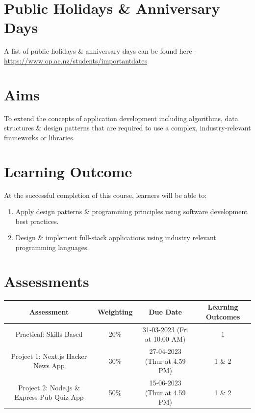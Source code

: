 \documentclass{article}
\begin{document}
\section*{Public Holidays \& Anniversary Days}
A list of public holidays \& anniversary days can be found here - \href{https://www.op.ac.nz/students/importantdates}{https://www.op.ac.nz/students/importantdates}

\section*{Aims}
To extend the concepts of application development including algorithms, data structures \& design patterns that are required to use a complex, industry-relevant frameworks or libraries.

\section*{Learning Outcome}
At the successful completion of this course, learners will be able to:
\begin{enumerate}
	\item Apply design patterns \& programming principles using software development best practices.
	\item Design \& implement full-stack applications using industry relevant programming languages.
\end{enumerate}

\section*{Assessments}
\renewcommand{\arraystretch}{1.5}
\begin{tabular}{|c|c|c|c|}
	\hline
	\textbf{Assessment}                                 & \textbf{Weighting} & \textbf{Due Date}            & \textbf{Learning Outcomes} \\ \hline
	\small Practical: Skills-Based & \small 20\%        & \small 31-03-2023 (Fri at 10.00 AM)   & \small 1                   \\ \hline
	\small Project 1: Next.js Hacker News App             & \small 30\%        & \small 27-04-2023 (Thur at 4.59 PM)  & \small 1 \& 2                   \\ \hline
	\small Project 2: Node.js \& Express Pub Quiz App                       & \small 50\%        & \small 15-06-2023 (Thur at 4.59 PM)  & \small 1 \& 2                   \\ \hline
\end{tabular}
\end{document}
